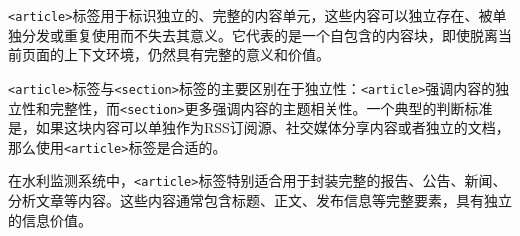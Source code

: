 \texttt{\textless{}article\textgreater{}}标签用于标识独立的、完整的内容单元，这些内容可以独立存在、被单独分发或重复使用而不失去其意义。它代表的是一个自包含的内容块，即使脱离当前页面的上下文环境，仍然具有完整的意义和价值。

\texttt{\textless{}article\textgreater{}}标签与\texttt{\textless{}section\textgreater{}}标签的主要区别在于独立性：\texttt{\textless{}article\textgreater{}}强调内容的独立性和完整性，而\texttt{\textless{}section\textgreater{}}更多强调内容的主题相关性。一个典型的判断标准是，如果这块内容可以单独作为RSS订阅源、社交媒体分享内容或者独立的文档，那么使用\texttt{\textless{}article\textgreater{}}标签是合适的。

在水利监测系统中，\texttt{\textless{}article\textgreater{}}标签特别适合用于封装完整的报告、公告、新闻、分析文章等内容。这些内容通常包含标题、正文、发布信息等完整要素，具有独立的信息价值。

\begin{Shaded}
\begin{Highlighting}[]
\DataTypeTok{\textless{}}\DataTypeTok{\textgreater{}}
    \DataTypeTok{\textless{}}\DataTypeTok{\textgreater{}}
        \DataTypeTok{\textless{}}\DataTypeTok{\textgreater{}}\DataTypeTok{\textless{}/}\DataTypeTok{\textgreater{}}
        \DataTypeTok{\textless{}}\DataTypeTok{\textgreater{}}\DataTypeTok{\textless{}/}\DataTypeTok{\textgreater{}}
        \DataTypeTok{\textless{}}\DataTypeTok{\textgreater{}}\DataTypeTok{\textless{}/}\DataTypeTok{\textgreater{}}
    \DataTypeTok{\textless{}/}\DataTypeTok{\textgreater{}}
    \DataTypeTok{\textless{}}\DataTypeTok{\textgreater{}}\DataTypeTok{\textless{}/}\DataTypeTok{\textgreater{}}
    \DataTypeTok{\textless{}}\DataTypeTok{\textgreater{}}
        \DataTypeTok{\textless{}}\DataTypeTok{\textgreater{}}\DataTypeTok{\textless{}/}\DataTypeTok{\textgreater{}}
        \DataTypeTok{\textless{}}\DataTypeTok{\textgreater{}}\DataTypeTok{\textless{}/}\DataTypeTok{\textgreater{}}
    \DataTypeTok{\textless{}/}\DataTypeTok{\textgreater{}}
\DataTypeTok{\textless{}/}\DataTypeTok{\textgreater{}}
\end{Highlighting}
\end{Shaded}

